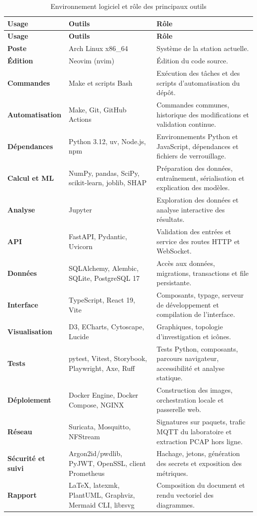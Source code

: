 \clearpage
\begingroup
\small
\renewcommand{\arraystretch}{1.16}
\begin{longtable}{@{}>{\bfseries\color{PremiumEmerald}}p{}>{\raggedright\arraybackslash}p{}>{\raggedright\arraybackslash}p{}@{}}
  \caption{Environnement logiciel et rôle des principaux outils}\label{tab:software-environment}\\
  \rowcolor{PremiumEmerald}\color{white}\bfseries Usage & \color{white}\bfseries Outils & \color{white}\bfseries Rôle \\
  \endfirsthead
  \rowcolor{PremiumEmerald}\color{white}\bfseries Usage & \color{white}\bfseries Outils & \color{white}\bfseries Rôle \\
  \endhead
  Poste & Arch Linux x86\_64 & Système de la station actuelle. \\
  \'Edition & Neovim (nvim) & \'Edition du code source. \\
  Commandes & Make et scripts Bash & Exécution des tâches et des scripts d'automatisation du dépôt. \\
  Automatisation & Make, Git, GitHub Actions & Commandes communes, historique des modifications et validation continue. \\
  Dépendances & Python 3.12, uv, Node.js, npm & Environnements Python et JavaScript, dépendances et fichiers de verrouillage. \\
  Calcul et ML & NumPy, pandas, SciPy, scikit-learn, joblib, SHAP & Préparation des données, entraînement, sérialisation et explication des modèles. \\
  Analyse & Jupyter & Exploration des donn\'ees et analyse interactive des r\'esultats. \\
  API & FastAPI, Pydantic, Uvicorn & Validation des entrées et service des routes HTTP et WebSocket. \\
  Données & SQLAlchemy, Alembic, SQLite, PostgreSQL 17 & Accès aux données, migrations, transactions et file persistante. \\
  Interface & TypeScript, React 19, Vite & Composants, typage, serveur de développement et compilation de l'interface. \\
  Visualisation & D3, ECharts, Cytoscape, Lucide & Graphiques, topologie d'investigation et icônes. \\
  Tests & pytest, Vitest, Storybook, Playwright, Axe, Ruff & Tests Python, composants, parcours navigateur, accessibilité et analyse statique. \\
  Déploiement & Docker Engine, Docker Compose, NGINX & Construction des images, orchestration locale et passerelle web. \\
  Réseau & Suricata, Mosquitto, NFStream & Signatures sur paquets, trafic MQTT du laboratoire et extraction PCAP hors ligne. \\
  Sécurité et suivi & Argon2id/pwdlib, PyJWT, OpenSSL, client Prometheus & Hachage, jetons, génération des secrets et exposition des métriques. \\
  Rapport & LaTeX, latexmk, PlantUML, Graphviz, Mermaid CLI, librsvg & Composition du document et rendu vectoriel des diagrammes. \\
  \bottomrule
\end{longtable}

